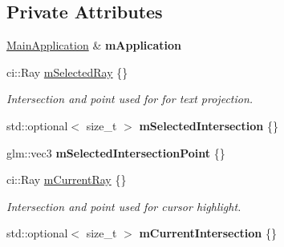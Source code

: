 \subsection*{Private Attributes}
\begin{DoxyCompactItemize}
\item 
\mbox{\label{classpepr3d_1_1_text_editor_a8c2340d0b6d8d583c4582cbfedb2b852}} 
\mbox{\hyperlink{classpepr3d_1_1_main_application}{Main\+Application}} \& {\bfseries m\+Application}
\item 
\mbox{\label{classpepr3d_1_1_text_editor_a0bf4101cffb4567e68c2ee19ed1476f1}} 
ci\+::\+Ray \mbox{\hyperlink{classpepr3d_1_1_text_editor_a0bf4101cffb4567e68c2ee19ed1476f1}{m\+Selected\+Ray}} \{\}
\begin{DoxyCompactList}\small\item\em Intersection and point used for for text projection. \end{DoxyCompactList}\item 
\mbox{\label{classpepr3d_1_1_text_editor_a1a0efb92849ddd1901a264cfa15ef294}} 
std\+::optional$<$ size\+\_\+t $>$ {\bfseries m\+Selected\+Intersection} \{\}
\item 
\mbox{\label{classpepr3d_1_1_text_editor_a7688ecc7a7f2f1abd04f50461fb4b909}} 
glm\+::vec3 {\bfseries m\+Selected\+Intersection\+Point} \{\}
\item 
\mbox{\label{classpepr3d_1_1_text_editor_accf4f63e05399a24062d88ce13c1056b}} 
ci\+::\+Ray \mbox{\hyperlink{classpepr3d_1_1_text_editor_accf4f63e05399a24062d88ce13c1056b}{m\+Current\+Ray}} \{\}
\begin{DoxyCompactList}\small\item\em Intersection and point used for cursor highlight. \end{DoxyCompactList}\item 
\mbox{\label{classpepr3d_1_1_text_editor_ade2da5abbcd47021fe88ecbe5febdbb9}} 
std\+::optional$<$ size\+\_\+t $>$ {\bfseries m\+Current\+Intersection} \{\}
\item 
\mbox{\label{classpepr3d_1_1_text_editor_ae577cc4fe9f9d2bc1ae73f179ea4f818}} 

\end{DoxyCompactItemize}
